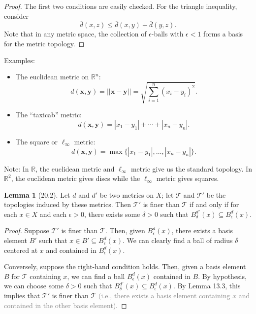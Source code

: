 \documentclass{article}
\newcommand{\nline}{\vspace*{0.5\baselineskip}}
\newcommand{\com}[1]{\textcolor{grey}{#1}}
\theoremstyle{definition}
\newtheorem{lemma}{Lemma}[subsection]
\begin{document}
\begin{flushleft}
\begin{proof}
The first two conditions are easily checked. For the triangle inequality, consider
\[
\overline{d}(x,z) \leq \overline{d}(x,y) + \overline{d}(y,z).
\]
Note that in any metric space, the collection of $\epsilon$-balls with $\epsilon < 1$ forms a basis for the metric topology.
\end{proof}

Examples:

\begin{itemize}
    \item The euclidean metric on $\mathbb{R}^n$:
    \[
    d(\textbf{x},\textbf{y}) = ||\textbf{x} - \textbf{y}|| = \sqrt{\sum_{i=1}^n (x_i - y_i)^2}.
    \]
    \item The ``taxicab'' metric:
    \[
    d(\textbf{x},\textbf{y}) = |x_1 - y_1| + \cdots + |x_n - y_n|.
    \]
    \item The square or $\ell_\infty$ metric:
    \[
    d(\textbf{x},\textbf{y}) = \max\{|x_1 - y_1|,\dots,|x_n - y_n|\}.
    \]
\end{itemize}

Note: In $\mathbb{R}$, the euclidean metric and $\ell_\infty$ metric give us the standard topology. In $\mathbb{R}^2$, the euclidean metric gives discs while the $\ell_\infty$ metric gives squares.

\begin{lemma}[20.2]
Let $d$ and $d'$ be two metrics on $X$; let $\mathcal{T}$ and $\mathcal{T}'$ be the topologies induced by these metrics. Then $\mathcal{T}'$ is finer than $\mathcal{T}$ if and only if for each $x \in X$ and each $\epsilon > 0$, there exists some $\delta > 0$ such that $B_\delta^{d'}(x) \subseteq B_\epsilon^d(x)$.
\end{lemma}

\begin{proof}
Suppose $\mathcal{T}'$ is finer than $\mathcal{T}$. Then, given $B_\epsilon^d(x)$, there exists a basis element $B'$ such that $x \in B' \subseteq B_\epsilon^d(x)$. We can clearly find a ball of radius $\delta$ centered at $x$ and contained in $B_\epsilon^d(x)$.

\nline

Conversely, suppose the right-hand condition holds. Then, given a basis element $B$ for $\mathcal{T}$ containing $x$, we can find a ball $B_\epsilon^d(x)$ contained in $B$. By hypothesis, we can choose some $\delta > 0$ such that $B_\delta^{d'}(x) \subseteq B_\epsilon^d(x)$. By Lemma 13.3, this implies that $\mathcal{T}'$ is finer than $\mathcal{T}$ \com{(i.e., there exists a basis element containing $x$ and contained in the other basis element)}.
\end{proof}


\end{flushleft}
\end{document}
